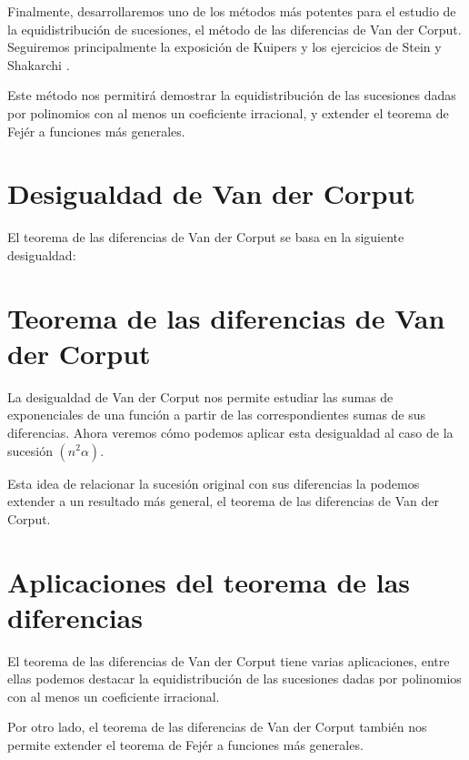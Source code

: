 Finalmente, desarrollaremos uno de los métodos más potentes para el estudio de
la equidistribución de sucesiones, el método de las diferencias de Van der Corput. Seguiremos
principalmente la exposición de Kuipers \cite[Capítulo 3]{kuipers-1974} y los ejercicios de
Stein y Shakarchi \cite[Problema 4.6.2]{stein-2003}.

Este método nos permitirá demostrar la equidistribución de las sucesiones dadas 
por polinomios con al menos un coeficiente irracional, y extender el teorema de Fejér
a funciones más generales.

\section{Desigualdad de Van der Corput}

El teorema de las diferencias de Van der Corput se basa en la siguiente desigualdad:



\section{Teorema de las diferencias de Van der Corput}

La desigualdad de Van der Corput nos permite estudiar las sumas de exponenciales
de una función a partir de las correspondientes sumas de sus diferencias. Ahora veremos 
cómo podemos aplicar esta desigualdad al caso de la sucesión $(n^2\alpha)$.



Esta idea de relacionar la sucesión original con sus diferencias la podemos extender 
a un resultado más general, el teorema de las diferencias de Van der Corput.



\section{Aplicaciones del teorema de las diferencias}

El teorema de las diferencias de Van der Corput tiene varias aplicaciones, entre ellas 
podemos destacar la equidistribución de las sucesiones dadas por polinomios con al menos
un coeficiente irracional.



Por otro lado, el teorema de las diferencias de Van der Corput también nos permite extender
el teorema de Fejér a funciones más generales.








